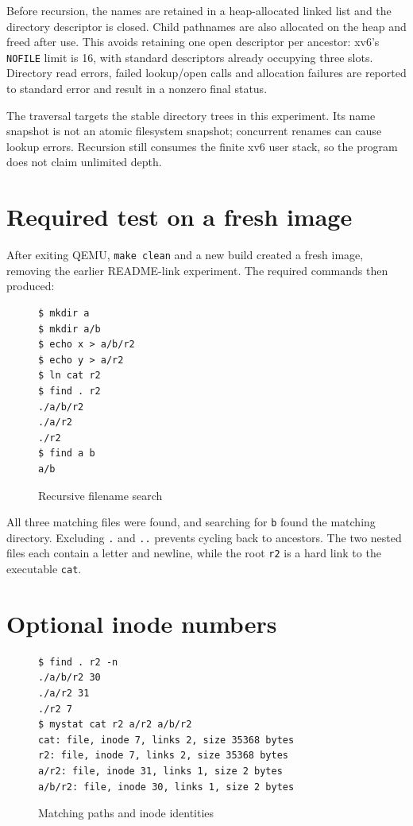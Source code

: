 \documentclass{../latex/utmreport}
\begin{document}
Before recursion, the names are retained in a heap-allocated linked list
and the directory descriptor is closed. Child pathnames are also
allocated on the heap and freed after use. This avoids retaining one
open descriptor per ancestor: xv6's \texttt{NOFILE} limit is 16, with
standard descriptors already occupying three slots. Directory read
errors, failed lookup/open calls and allocation failures are reported to
standard error and result in a nonzero final status.

The traversal targets the stable directory trees in this experiment. Its
name snapshot is not an atomic filesystem snapshot; concurrent renames
can cause lookup errors. Recursion still consumes the finite xv6 user
stack, so the program does not claim unlimited depth.

\section{Required test on a fresh
image}\label{required-test-on-a-fresh-image}

After exiting QEMU, \texttt{make\ clean} and a new build created a fresh
image, removing the earlier README-link experiment. The required
commands then produced:

\begin{figure}[H]
\begin{lstlisting}
$ mkdir a
$ mkdir a/b
$ echo x > a/b/r2
$ echo y > a/r2
$ ln cat r2
$ find . r2
./a/b/r2
./a/r2
./r2
$ find a b
a/b
\end{lstlisting}
\caption{Recursive filename search}
\end{figure}

All three matching files were found, and searching for \texttt{b} found
the matching directory. Excluding \texttt{.} and \texttt{..} prevents
cycling back to ancestors. The two nested files each contain a letter
and newline, while the root \texttt{r2} is a hard link to the executable
\texttt{cat}.

\section{Optional inode numbers}\label{optional-inode-numbers}

\begin{figure}[H]
\begin{lstlisting}
$ find . r2 -n
./a/b/r2 30
./a/r2 31
./r2 7
$ mystat cat r2 a/r2 a/b/r2
cat: file, inode 7, links 2, size 35368 bytes
r2: file, inode 7, links 2, size 35368 bytes
a/r2: file, inode 31, links 1, size 2 bytes
a/b/r2: file, inode 30, links 1, size 2 bytes
\end{lstlisting}
\caption{Matching paths and inode identities}
\end{figure}
\end{document}
